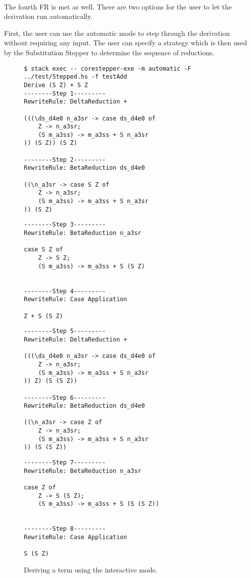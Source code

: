 \ \\
The fourth FR is met as well.
There are two options for the user to let the derivation run automatically.

First, the user can use the automatic mode to step through the derivation without requiring any input.
The user can specify a strategy which is then used by the Substitution Stepper to determine the sequence of reductions.

\begin{figure}[!ht]
\begin{verbatim}
$ stack exec -- corestepper-exe -m automatic -F ../test/Stepped.hs -f testAdd
Derive (S Z) + S Z
--------Step 1---------
RewriteRule: DeltaReduction +

(((\ds_d4e0 n_a3sr -> case ds_d4e0 of
    Z -> n_a3sr;
    (S m_a3ss) -> m_a3ss + S n_a3sr
)) (S Z)) (S Z)

--------Step 2---------
RewriteRule: BetaReduction ds_d4e0

((\n_a3sr -> case S Z of
    Z -> n_a3sr;
    (S m_a3ss) -> m_a3ss + S n_a3sr
)) (S Z)
\end{verbatim}
\end{figure}
\begin{figure}[!ht]
\begin{verbatim}
--------Step 3---------
RewriteRule: BetaReduction n_a3sr

case S Z of
    Z -> S Z;
    (S m_a3ss) -> m_a3ss + S (S Z)


--------Step 4---------
RewriteRule: Case Application

Z + S (S Z)
\end{verbatim}
\end{figure}
\begin{figure}[!ht]
\begin{verbatim}
--------Step 5---------
RewriteRule: DeltaReduction +

(((\ds_d4e0 n_a3sr -> case ds_d4e0 of
    Z -> n_a3sr;
    (S m_a3ss) -> m_a3ss + S n_a3sr
)) Z) (S (S Z))

--------Step 6---------
RewriteRule: BetaReduction ds_d4e0

((\n_a3sr -> case Z of
    Z -> n_a3sr;
    (S m_a3ss) -> m_a3ss + S n_a3sr
)) (S (S Z))
\end{verbatim}
\end{figure}
\begin{figure}[!ht]
\begin{verbatim}
--------Step 7---------
RewriteRule: BetaReduction n_a3sr

case Z of
    Z -> S (S Z);
    (S m_a3ss) -> m_a3ss + S (S (S Z))


--------Step 8---------
RewriteRule: Case Application

S (S Z)
\end{verbatim}
    \caption{Deriving a term using the interactive mode.}
    \label{fig:FR4example1}
\end{figure}

